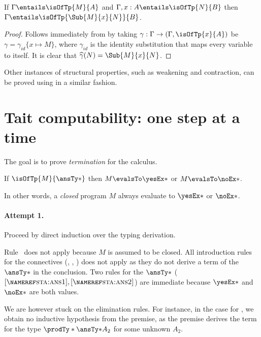 \documentclass[letterpaper]{article}
\begin{document}
\begin{corollary}
If $\Gamma \entails \isOfTp{M}{A}$ and $\Gamma, x : A \entails \isOfTp{N}{B}$ then $\Gamma \entails \isOfTp{\Sub{M}{x}{N}}{B}$.
\end{corollary}

\begin{proof}
  Follows immediately from  by taking $\gamma : \Gamma \to (\Gamma, \isOfTp{x}{A})$ be $\gamma = \gamma_{id}\{x \mapsto M\}$, where $\gamma_{id}$ is the identity substitution that maps every variable to itself. It is clear that $\widehat{\gamma}(N) = \Sub{M}{x}{N}$.
\end{proof}

Other instances of structural properties, such as weakening and contraction, can be proved using  in a similar fashion.

\section{Tait computability: one step at a time}\label{sec:standard}

The goal is to prove \emph{termination} for the calculus.

\begin{theorem}
If $\isOfTp{M}{\ansTy*}$ then $M \evalsTo \yesEx*$ or $M \evalsTo \noEx*$.
\end{theorem}

In other words, a \emph{closed} program $M$ always evaluate to $\yesEx*$ or $\noEx*$.

\paragraph{Attempt 1.} Proceed by direct induction over the typing derivation.

Rule~ does not apply because $M$ is assumed to be closed. All introduction
rules for the connectives (, , )
does not apply as they do not derive a term of the $\ansTy*$ in the conclusion. Two
rules for the $\ansTy*$ ($\ruleref{sta:ans1}, \ruleref{sta:ans2}$) are immediate because
$\yesEx*$ and $\noEx*$ are both values.

We are however stuck on the elimination rules. For instance, in the case for ,
we obtain no inductive hypothesis from the premise, as the premise derives the term for the
type $\prodTy*{\ansTy*}{A_2}$ for some unknown $A_2$.
\end{document}
